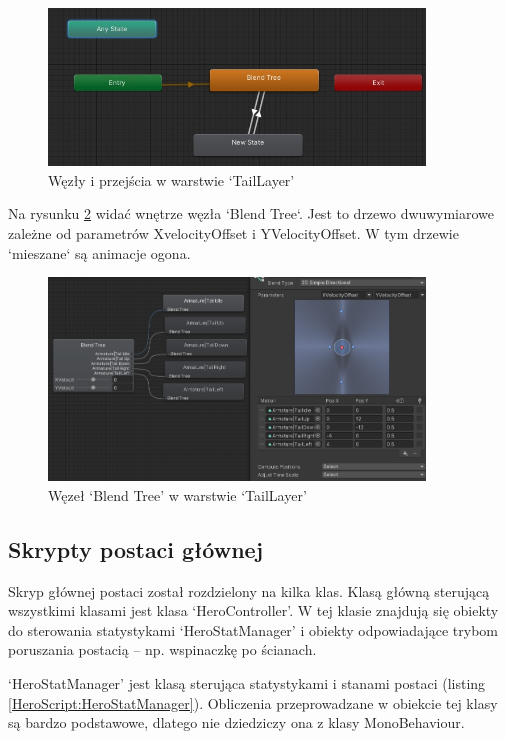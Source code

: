\documentclass[12pt,twoside]{article}
\begin{document}
\begin{figure}[!ht]
    \centering
	\includegraphics[width=10cm]{RealizacjaProjektu/UnityPictires/Animator/Player1_Animator_TailLayer.jpg}
	\caption{Węzły i przejścia w warstwie `TailLayer'}
    \label{Hero:Aniamtor:TailLayer}
\end{figure}

Na rysunku \ref{Hero:Aniamtor:TailLayerTree} widać wnętrze węzła `Blend Tree`.
Jest to drzewo dwuwymiarowe zależne od parametrów XvelocityOffset i
YVelocityOffset. W tym drzewie `mieszane` są animacje ogona.

\begin{figure}[!ht]
    \centering
	\includegraphics[width=10cm]{RealizacjaProjektu/UnityPictires/Animator/Player1_Animator_TaiLayer_BlendTree.jpg}
	\caption{Węzeł `Blend Tree' w warstwie `TailLayer'}
    \label{Hero:Aniamtor:TailLayerTree}
\end{figure}

\clearpage
\subsection{Skrypty postaci głównej}
Skryp głównej postaci został rozdzielony na kilka klas. Klasą główną sterującą
wszystkimi klasami jest klasa `HeroController'. W tej klasie znajdują się
obiekty do sterowania statystykami `HeroStatManager' i obiekty odpowiadające
trybom poruszania postacią -- np. wspinaczkę po ścianach.

`HeroStatManager' jest klasą sterująca statystykami i stanami postaci (listing
\ref{HeroScript:HeroStatManager}). Obliczenia przeprowadzane w obiekcie tej
klasy są bardzo podstawowe, dlatego  nie dziedziczy ona z klasy MonoBehaviour.
\end{document}
